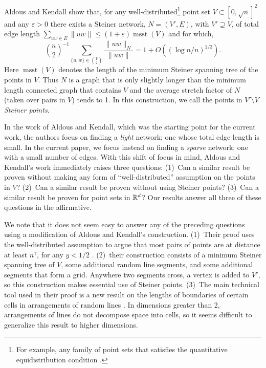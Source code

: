 \documentclass{patmorin}
\DeclareMathOperator{\msst}{msst}
\newcommand{\eps}{\varepsilon}
\begin{document}
Aldous and Kendall \cite[Section~5.3]{aldous.kendall:short-length}
show that, for any well-distributed\footnote{For example, any
family of point sets that satisfies the quantitative equidistribution
condition \cite[Definition~3]{aldous.kendall:short-length}.} point set
$V\subset[0,\sqrt{n}]^2$ and any $\eps > 0$ there exists a Steiner
network, $N=(V',E)$, with $V'\supseteq V$, of total edge length
$\sum_{uw\in E}\|uw\| \le (1+\eps)\msst(V)$ and for which,
\[
    \binom{n}{2}^{-1}\sum_{\{u,w\}\in \binom{V}{2}}\frac{\|uw\|_N}{\|uw\|} = 1 + O((\log n/n)^{1/3}) .
\]
Here $\msst(V)$ denotes the length of the minimum Steiner spanning tree
of the points in $V$.  Thus $N$ is a graph that is only slightly longer
than the minimum length connected graph that contains $V$ and the average
stretch factor of $N$ (taken over pairs in $V$) tends to 1.  In this
construction, we call the points in $V'\setminus V$ \emph{Steiner points}.

In the work of Aldous and Kendall, which was the starting point for
the current work, the authors focus on finding a \emph{light} network;
one whose total edge length is small.  In the current paper, we focus
instead on finding a \emph{sparse} network; one with a small number
of edges.  With this shift of focus in mind, Aldous and Kendall's
work immediately raises three questions: (1)~Can a similar result be
proven without making any form of ``well-distributed'' assumption on the
points in $V$? (2)~Can a similar result be proven without using Steiner
points? (3)~Can a similar result be proven for point sets in $\mathbb{R}^d$?
Our results answer all three of these questions in the affirmative.

We note that it does not seem easy to answer any of the preceding
questions using a modification of Aldous and Kendall's construction.
(1)~Their proof uses the well-distributed assumption to argue that
most pairs of points are at distance at least $n^{\gamma}$, for any
$y<1/2$ \cite[Section~5.3]{aldous.kendall:short-length}.  (2)~their
construction consists of a minimum Steiner spanning tree of $V$,
some additional random line segments, and some additional segments
that form a grid.  Anywhere two segments cross, a vertex is added
to $V'$, so this construction makes essential use of Steiner points.
(3)~The main technical tool used in their proof is a new result on the
lengths of boundaries of certain cells in arrangements of random lines
\cite[Theorems~3 and 4]{aldous.kendall:short-length}.  In dimensions
greater than 2, arrangements of lines do not decompose space into cells,
so it seems difficult to generalize this result to higher dimensions.
\end{document}
